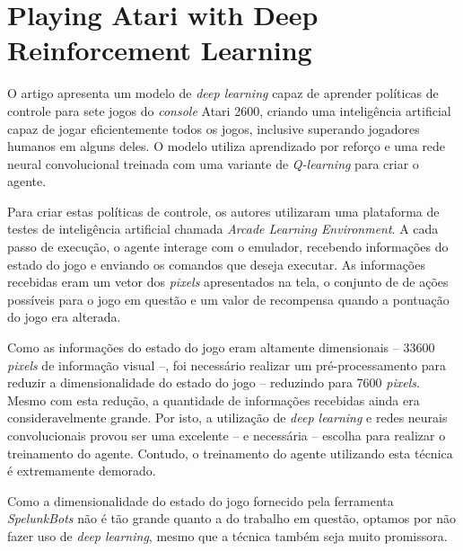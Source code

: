 \section{Playing Atari with Deep Reinforcement Learning}
O artigo apresenta um modelo de \textit{deep learning} capaz de aprender
políticas de controle para sete jogos do \textit{console} Atari 2600, criando
uma inteligência artificial capaz de jogar eficientemente todos os jogos,
inclusive superando jogadores humanos em alguns
deles\cite{DBLP:journals/corr/MnihKSGAWR13}. O modelo utiliza aprendizado por
reforço e uma rede neural convolucional treinada com uma variante de
\textit{Q-learning} para criar o agente.

Para criar estas políticas de controle, os autores utilizaram uma plataforma de
testes de inteligência artificial chamada \textit{Arcade Learning Environment}.
A cada passo de execução, o agente interage com o emulador, recebendo
informações do estado do jogo e enviando os comandos que deseja executar. As
informações recebidas eram um vetor dos \textit{pixels} apresentados na tela, o
conjunto de de ações possíveis para o jogo em questão e um valor de recompensa
quando a pontuação do jogo era alterada.

Como as informações do estado do jogo eram altamente dimensionais -- 33600
\textit{pixels} de informação visual --, foi necessário realizar um
pré-processamento para reduzir a dimensionalidade do estado do jogo -- reduzindo
para 7600 \textit{pixels}. Mesmo com esta redução, a quantidade de informações
recebidas ainda era consideravelmente grande. Por isto, a utilização de
\textit{deep learning} e redes neurais convolucionais provou ser uma excelente
-- e necessária -- escolha para realizar o treinamento do agente. Contudo, o
treinamento do agente utilizando esta técnica é extremamente demorado.

Como a dimensionalidade do estado do jogo fornecido pela ferramenta
\textit{SpelunkBots} não é tão grande quanto a do trabalho em questão, optamos
por não fazer uso de \textit{deep learning}, mesmo que a técnica também seja
muito promissora.


